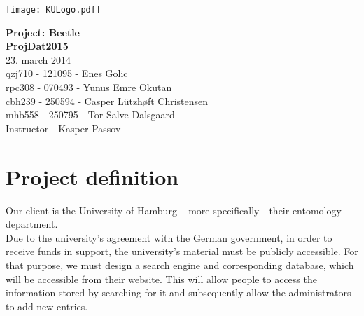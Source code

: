 \documentclass[12pt,a4paper]{article}
\begin{document}
	
	\begin{minipage}[b]{1.0\linewidth} 
		\texttt{[image: KULogo.pdf]}
		
		\vspace*{-16ex}
		\vspace {35ex}
		\begin{center}
			{\huge \bf Project: Beetle} \vspace*{4ex} \\
			{\huge \bf ProjDat2015} \vspace*{4ex} \\
			{\large 23. march 2014}\\
			\vspace*{2ex}
			qzj710 - 121095 - Enes Golic \\
			rpc308 - 070493 - Yunus Emre Okutan \\
			cbh239 - 250594 - Casper Lützhøft Christensen \\
			mhb558 - 250795 - Tor-Salve Dalsgaard\\
			\vspace*{1ex}
			Instructor - Kasper Passov
			
		\end{center}
	\end{minipage}
	
\newpage
\section{Project definition}
Our client is the University of Hamburg – more specifically - their entomology department.\\
Due to the university’s agreement with the German government, in order to receive funds in support, the university’s material must be publicly accessible. For that purpose, we must design a search engine and corresponding database, which will be accessible from their website. This will allow people to access the information stored by searching for it and subsequently allow the administrators to add new entries.\\ 
\end{document}
